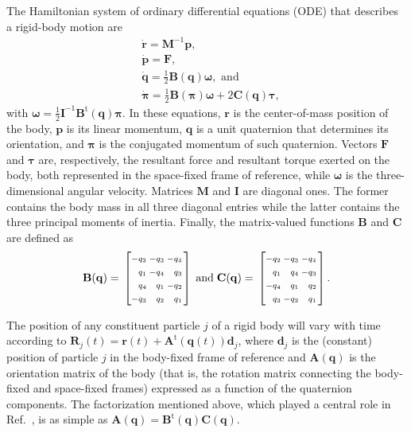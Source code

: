 \documentclass[
journal=jctcce,
layout=twocolumn
]{achemso}
\makeatletter
\newcommand{\mt}[1]{\boldsymbol{\mathbf{#1}}}   %
\newcommand{\vt}[1]{\boldsymbol{\mathbf{#1}}}   %
\newcommand{\tr}[1]{#1^\text{t}}                %
\newcommand{\diff}[2]{\frac{\partial #1}{\partial #2}} %
\newcommand{\Ham}[1]{{\mathcal H}_\text{#1}}    %
\newenvironment{smallarray}[1]                          %
{\null\,\vcenter\bgroup\scriptsize
	\renewcommand{\arraystretch}{1.5}
	\arraycolsep=.13885em
	\hbox\bgroup$\left[\array{@{}#1@{}}}
{\endarray\right]$\egroup\egroup\,\null}
\makeatother
\begin{document}
The Hamiltonian system of ordinary differential equations (ODE) that describes a rigid-body motion are \cite{Silveira_2017}
\begin{subequations}
	\label{eq:ODE system for NVE}
	\begin{align}
%
	&\dot{\vt r} =
	{\mt M}^{-1} {\vt p}, \\
%
	&\dot{\vt p} =
	{\vt F}, \\
%
	&\dot{\vt q} =
	\frac{1}{2} \mt B(\vt q) \vt \omega, \text{ and} \label{eq:EDO_q} \\
%
	&\dot{\vt \pi} =
	\frac{1}{2} \mt B(\vt \pi) \vt \omega + 2 \mt C(\vt q) \vt \tau, \label{eq:EDO_pi}
	\end{align}
\end{subequations}
with $\vt \omega = \frac{1}{2} {\mt I}^{-1} \tr{\mt B}(\vt q) {\vt \pi}$. In these equations, $\vt r$ is the center-of-mass position of the body, $\vt p$ is its linear momentum, $\vt q$ is a unit quaternion that determines its orientation, and $\vt \pi$ is the conjugated momentum of such quaternion. Vectors $\vt F$ and $\vt \tau$ are, respectively, the resultant force and resultant torque exerted on the body, both represented in the space-fixed frame of reference, while $\vt \omega$ is the three-dimensional angular velocity. Matrices $\mt M$ and $\mt I$ are diagonal ones. The former contains the body mass in all three diagonal entries while the latter contains the three principal moments of inertia. Finally, the matrix-valued functions $\mt B$ and $\vt C$ are defined as
\begin{equation*}
\label{eq:def_B_and_C}
\mt B(\vt q) = \begin{smallarray}{rrrr}
-q_2 & -q_3 & -q_4 \\
 q_1 & -q_4 &  q_3 \\
 q_4 &  q_1 & -q_2 \\
-q_3 &  q_2 &  q_1
\end{smallarray}
\; \text{and} \;
\mt C(\vt q) = \begin{smallarray}{rrrr}
-q_2 & -q_3 & -q_4 \\
 q_1 &  q_4 & -q_3 \\
-q_4 &  q_1 &  q_2 \\
 q_3 & -q_2 &  q_1
\end{smallarray}.
\end{equation*}

The position of any constituent particle $j$ of a rigid body will vary with time according to $\vt R_j(t) = \vt r(t) + \tr{\mt A}(\vt q(t))\vt d_j$, where $\vt d_j$ is the (constant) position of particle $j$ in the body-fixed frame of reference and ${\mt A}(\vt q)$ is the orientation matrix of the body (that is, the rotation matrix connecting the body-fixed and space-fixed frames) expressed as a function of the quaternion components. The factorization mentioned above, which played a central role in Ref.~, is as simple as ${\mt A}(\vt q) = \tr{\mt B}(\vt q) {\mt C}(\vt q)$.
\end{document}
